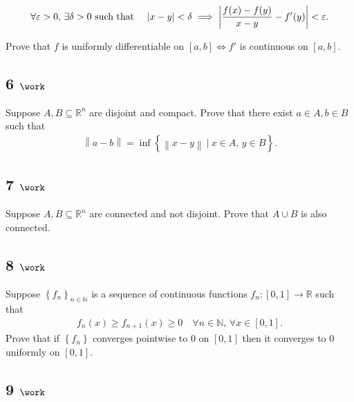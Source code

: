 \begin{align*}  
\forall \varepsilon > 0,\, \exists \delta > 0 \text{ such that } \quad {\left\lvert {x-y} \right\rvert} < \delta \implies {\left\lvert { {f(x) - f(y) \over x-y}  - f'(y)} \right\rvert}  < \varepsilon
.\end{align*}

Prove that \(f\) is uniformly differentiable on \([a, b] \iff f'\) is
continuous on \([a, b]\).

\hypertarget{work-5}{%
\subsection{\texorpdfstring{6
\(\work\)}{6 \textbackslash work}}\label{work-5}}

Suppose \(A, B \subseteq {\mathbb{R}}^n\) are disjoint and compact.
Prove that there exist \(a\in A, b\in B\) such that
\begin{align*}  
{\left\lVert {a - b} \right\rVert} = \inf\left\{{{\left\lVert {x-y} \right\rVert} {~\mathrel{\Big|}~}x\in A,\, y\in B}\right\}
.\end{align*}

\hypertarget{work-6}{%
\subsection{\texorpdfstring{7
\(\work\)}{7 \textbackslash work}}\label{work-6}}

Suppose \(A, B\subseteq {\mathbb{R}}^n\) are connected and not disjoint.
Prove that \(A\cup B\) is also connected.

\hypertarget{work-7}{%
\subsection{\texorpdfstring{8
\(\work\)}{8 \textbackslash work}}\label{work-7}}

Suppose \(\left\{{f_n}\right\}_{n\in {\mathbb{N}}}\) is a sequence of
continuous functions \(f_n: [0, 1]\to {\mathbb{R}}\) such that
\begin{align*}  
f_n(x) \geq f_{n+1}(x) \geq 0 \quad \forall n\in {\mathbb{N}},\, \forall x\in [0, 1]
.\end{align*}
Prove that if \(\left\{{f_n}\right\}\) converges pointwise to \(0\) on
\([0, 1]\) then it converges to \(0\) uniformly on \([0, 1]\).

\hypertarget{work-8}{%
\subsection{\texorpdfstring{9
\(\work\)}{9 \textbackslash work}}\label{work-8}}


